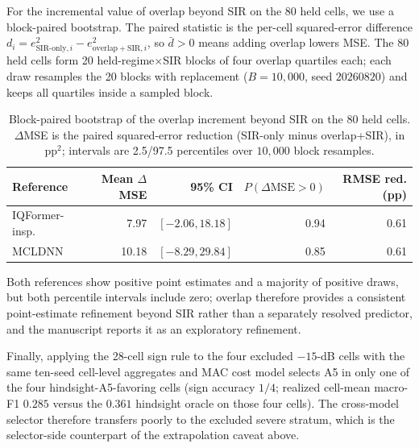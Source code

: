 \documentclass[letterpaper,onecolumn,11pt,journal]{IEEEtran}
\begin{document}
For the incremental value of overlap beyond SIR on the 80 held cells, we use
a block-paired bootstrap. The paired statistic is the per-cell
squared-error difference
$d_i=e^2_{\mathrm{SIR\text{-}only},i}-e^2_{\mathrm{overlap+SIR},i}$, so
$\bar d>0$ means adding overlap lowers MSE. The 80 held cells form 20
held-regime$\times$SIR blocks of four overlap quartiles each; each draw
resamples the 20 blocks with replacement ($B=10{,}000$, seed $20260820$)
and keeps all quartiles inside a sampled block.

\begin{table}[t]
\centering
\caption{Block-paired bootstrap of the overlap increment beyond SIR on the
80 held cells. $\Delta$MSE is the paired squared-error reduction
(SIR-only minus overlap+SIR), in $\mathrm{pp}^2$; intervals are 2.5/97.5
percentiles over $10{,}000$ block resamples.}
\label{tab:bootpair}
\footnotesize
\setlength{\tabcolsep}{4pt}
\begin{tabular}{lrrrr}
\toprule
Reference & Mean $\Delta$MSE & 95\% CI & $P(\Delta\mathrm{MSE}>0)$ & RMSE red. (pp)\\
\midrule
IQFormer-insp. & 7.97 & $[-2.06, 18.18]$ & 0.94 & 0.61\\
MCLDNN & 10.18 & $[-8.29, 29.84]$ & 0.85 & 0.61\\
\bottomrule
\end{tabular}
\end{table}

Both references show positive point estimates and a majority of positive
draws, but both percentile intervals include zero; overlap therefore provides
a consistent point-estimate refinement beyond SIR rather than a separately
resolved predictor, and the manuscript reports it as an exploratory
refinement.

Finally, applying the 28-cell sign rule to the four excluded $-15$-dB cells
with the same ten-seed cell-level aggregates and MAC cost model selects A5
in only one of the four hindsight-A5-favoring cells (sign accuracy $1/4$;
realized cell-mean macro-F1 $0.285$ versus the $0.361$ hindsight oracle on
those four cells). The cross-model selector therefore transfers poorly to
the excluded severe stratum, which is the selector-side counterpart of the
extrapolation caveat above.
\end{document}
